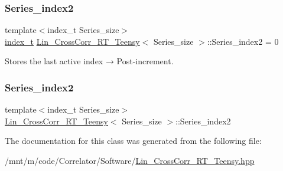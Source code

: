 \subsubsection{\texorpdfstring{Series\+\_\+index2}{Series\_index2}\hspace{0.1cm}{\footnotesize\ttfamily [1/2]}}
{\footnotesize\ttfamily template$<$index\+\_\+t Series\+\_\+size$>$ \\
\hyperlink{types_8hpp_a7c40bb931c31595ed6308605f4537447}{index\+\_\+t} \hyperlink{classLin__CrossCorr__RT__Teensy}{Lin\+\_\+\+Cross\+Corr\+\_\+\+R\+T\+\_\+\+Teensy}$<$ Series\+\_\+size $>$\+::Series\+\_\+index2 = 0}



Stores the last active index → Post-\/increment. 

\mbox{\label{classLin__CrossCorr__RT__Teensy_a4f84a456a7d6e90e8676e4c5ed059776}} 
\subsubsection{\texorpdfstring{Series\+\_\+index2}{Series\_index2}\hspace{0.1cm}{\footnotesize\ttfamily [2/2]}}
{\footnotesize\ttfamily template$<$index\+\_\+t Series\+\_\+size$>$ \\
\hyperlink{classLin__CrossCorr__RT__Teensy}{Lin\+\_\+\+Cross\+Corr\+\_\+\+R\+T\+\_\+\+Teensy}$<$ Series\+\_\+size $>$\+::Series\+\_\+index2}



The documentation for this class was generated from the following file\+:\begin{DoxyCompactItemize}
\item 
/mnt/m/code/\+Correlator/\+Software/\hyperlink{Lin__CrossCorr__RT__Teensy_8hpp}{Lin\+\_\+\+Cross\+Corr\+\_\+\+R\+T\+\_\+\+Teensy.\+hpp}\end{DoxyCompactItemize}
